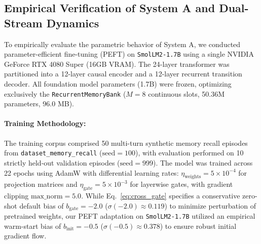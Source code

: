 \documentclass[11pt,a4paper]{article}
\begin{document}
\subsection{Empirical Verification of System A and Dual-Stream Dynamics}
\label{sec:system_a_eval}
To empirically evaluate the parametric behavior of System A, we conducted parameter-efficient fine-tuning (PEFT) on \texttt{SmolLM2-1.7B} using a single NVIDIA GeForce RTX 4080 Super (16GB VRAM). The 24-layer transformer was partitioned into a 12-layer causal encoder and a 12-layer recurrent transition decoder. All foundation model parameters (1.7B) were frozen, optimizing exclusively the \texttt{RecurrentMemoryBank} ($M=8$ continuous slots, 50.36M parameters, 96.0 MB).

\paragraph{Training Methodology:} The training corpus comprised 50 multi-turn synthetic memory recall episodes from \texttt{dataset\_memory\_recall} ($\text{seed}=100$), with evaluation performed on 10 strictly held-out validation episodes ($\text{seed}=999$). The model was trained across 22 epochs using AdamW with differential learning rates: $\eta_{\text{weights}} = 5 \times 10^{-4}$ for projection matrices and $\eta_{\text{gate}} = 5 \times 10^{-3}$ for layerwise gates, with gradient clipping $\text{max\_norm} = 5.0$. While Eq.~\ref{eq:cross_gate} specifies a conservative zero-shot default bias of $b_{\text{gate}} = -2.0$ ($\sigma(-2.0) \approx 0.119$) to minimize perturbation of pretrained weights, our PEFT adaptation on \texttt{SmolLM2-1.7B} utilized an empirical warm-start bias of $b_{\text{init}} = -0.5$ ($\sigma(-0.5) \approx 0.378$) to ensure robust initial gradient flow.
\end{document}
